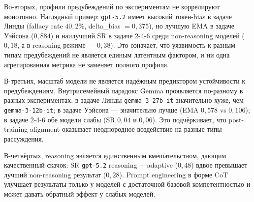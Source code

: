 Во-вторых, профили предубеждений по экспериментам не коррелируют монотонно. Наглядный пример: \texttt{gpt-5.2} имеет высокий токен-bias в задаче Линды (fallacy rate $40{,}2\%$, delta\_bias $= 0{,}375$), но лучшую EMA в задаче Уэйсона ($0{,}884$) и наилучший SR в задаче 2-4-6 среди non-reasoning моделей ($0{,}18$, а в reasoning-режиме --- $0{,}38$). Это означает, что уязвимость к разным типам предубеждений не является единым латентным фактором, и ни одна агрегированная метрика не заменяет полного профиля.

В-третьих, масштаб модели не является надёжным предиктором устойчивости к предубеждениям. Внутрисемейный парадокс Gemma проявляется по-разному в разных экспериментах: в задаче Линды \texttt{gemma-3-27b-it} значительно хуже, чем \texttt{gemma-3-12b-it}; в задаче Уэйсона --- значительно лучше (EMA $0{,}578$ vs $0{,}106$); в задаче 2-4-6 обе модели слабы (SR $0{,}04$ и $0{,}06$). Это подчёркивает, что post-training alignment оказывает неоднородное воздействие на разные типы рассуждения.

В-четвёртых, reasoning является единственным вмешательством, дающим качественный скачок: SR \texttt{gpt-5.2} reasoning + adaptive ($0{,}48$) вдвое превышает лучший non-reasoning результат ($0{,}28$). Prompt engineering в форме CoT улучшает результаты только у моделей с достаточной базовой компетентностью и может давать обратный эффект у слабых моделей.
